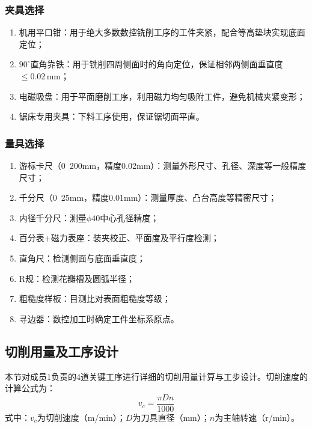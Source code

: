 \documentclass{xautCADreport}
\begin{document}
\subsubsection{夹具选择}

\begin{enumerate}
  \item 机用平口钳：用于绝大多数数控铣削工序的工件夹紧，配合等高垫块实现底面定位；
  \item $90^{\circ}$直角靠铁：用于铣削四周侧面时的角向定位，保证相邻两侧面垂直度$\leq0.02\,\mathrm{mm}$；
  \item 电磁吸盘：用于平面磨削工序，利用磁力均匀吸附工件，避免机械夹紧变形；
  \item 锯床专用夹具：下料工序使用，保证锯切面平直。
\end{enumerate}

\subsubsection{量具选择}

\begin{enumerate}
  \item 游标卡尺（0~200mm，精度0.02mm）：测量外形尺寸、孔径、深度等一般精度尺寸；
  \item 千分尺（0~25mm，精度0.01mm）：测量厚度、凸台高度等精密尺寸；
  \item 内径千分尺：测量$\phi40$中心孔径精度；
  \item 百分表+磁力表座：装夹校正、平面度及平行度检测；
  \item 直角尺：检测侧面与底面垂直度；
  \item R规：检测花瓣槽及圆弧半径；
  \item 粗糙度样板：目测比对表面粗糙度等级；
  \item 寻边器：数控加工时确定工件坐标系原点。
\end{enumerate}

\subsection{切削用量及工序设计}

本节对成员1负责的4道关键工序进行详细的切削用量计算与工步设计。切削速度的计算公式为：
\begin{equation}
  v_c = \frac{\pi D n}{1000}
  \label{eq:vc}
\end{equation}
\noindent 式中：$v_c$为切削速度（m/min）；$D$为刀具直径（mm）；$n$为主轴转速（r/min）。
\end{document}
